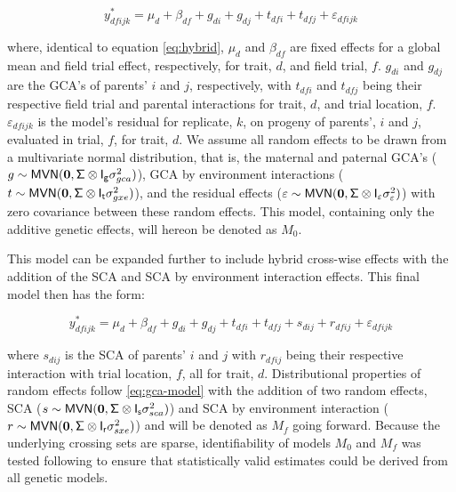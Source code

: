 \begin{equation}
  y_{dfijk}^* = \mu_d + \beta_{df} + g_{di} + g_{dj} + t_{dfi} + t_{dfj} + \varepsilon_{dfijk}
  \label{eq:gca-model}
\end{equation}

where, identical to equation \eqref{eq:hybrid}, \(\mu_d\) and \(\beta_{df}\) are fixed effects for a global mean and field trial effect, respectively, for trait, \(d\), and field trial, \(f\). \(g_{di}\) and \(g_{dj}\) are the GCA's of parents' \(i\) and \(j\), respectively, with \(t_{dfi}\) and \(t_{dfj}\) being their respective field trial and parental interactions for trait, \(d\), and trial location, \(f\). \(\varepsilon_{dfijk}\) is the model's residual for replicate, \(k\), on progeny of parents', \(i\) and \(j\), evaluated in trial, \(f\), for trait, \(d\). We assume all random effects to be drawn from a multivariate normal distribution, that is, the maternal and paternal GCA's (\(g\sim \mathsf{MVN}({\bf 0},\mathsf{\Sigma\otimes I_g}\sigma_{gca}^2)\)), GCA by environment interactions (\(t\sim \mathsf{MVN}({\bf 0},\mathsf{\Sigma\otimes I_t}\sigma_{gxe}^2)\)), and the residual effects (\(\varepsilon\sim \mathsf{MVN}({\bf 0},\mathsf{\Sigma\otimes I}_\varepsilon \sigma_\varepsilon^2)\)) with zero covariance between these random effects. This model, containing only the additive genetic effects, will hereon be denoted as \(M_0\).

This model can be expanded further to include hybrid cross-wise effects with the addition of the SCA and SCA by environment interaction effects. This final model then has the form:

\begin{equation}
  y_{dfijk}^* = \mu_d + \beta_{df} + g_{di} + g_{dj} + t_{dfi} + t_{dfj} + s_{dij} + r_{dfij} + \varepsilon_{dfijk}
  \label{eq:sca-model}
\end{equation}

where \(s_{dij}\) is the SCA of parents' \(i\) and \(j\) with \(r_{dfij}\) being their respective interaction with trial location, \(f\), all for trait, \(d\). Distributional properties of random effects follow \eqref{eq:gca-model} with the addition of two random effects, SCA (\(s\sim \mathsf{MVN}({\bf 0},\mathsf{\Sigma\otimes I_{s}}\sigma^2_{sca})\)) and SCA by environment interaction (\(r\sim \mathsf{MVN}({\bf 0},\mathsf{\Sigma\otimes I_{r}}\sigma^2_{sxe})\)) and will be denoted as \(M_f\) going forward. Because the underlying crossing sets are sparse, identifiability of models \(M_0\) and \(M_f\) was tested following \parencite{Xenakis2019} to ensure that statistically valid estimates could be derived from all genetic models.


